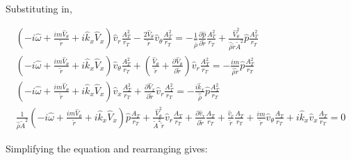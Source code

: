 \documentclass[12pt]{article}
\begin{document}
Substituting in,

\begin{small}
\begin{eqnarray}
\left(
-i \widehat{\omega} 
+ \frac{i m \widehat{V}_{\theta}}{\widetilde{r}}
+i \widehat{k}_x \widehat{V}_x 
\right) 
\widehat{v}_r 
\frac{A_T^2}{r_T}
-\frac{2 \widehat{V}_{\theta}}{\widetilde{r}} \widehat{v}_{\theta}
\frac{A_T^2}{r_T}
 = 
-\frac{1}{\widehat{\overline{\rho}}} \frac{\partial \widehat{p}}{\partial \widetilde{r}}
\frac{A_T^2}{r_T}
+\frac{\widehat{V}_{\theta}^2}{\widehat{\overline{\rho}} \widetilde{r} \widetilde{A}^2} 
\widehat{p}
\frac{A_T^2}{r_T}
\nonumber
\\
\left(
-i \widehat{\omega} 
+ \frac{i m \widehat{V}_{\theta}}{\widetilde{r}}
+i \widehat{k}_x \widehat{V}_x 
\right) 
\widehat{v}_{\theta} 
\frac{A_T^2}{r_T}
+
\left(
\frac{\widehat{V}_{\theta}}{\widetilde{r}}
+\frac{\partial \widehat{V}_{\theta}}{\partial \widetilde{r}}
\right) \widehat{v}_r
\frac{A_T^2}{r_T}
 = 
-\frac{i m}{\widehat{\overline{\rho}} \widetilde{r}} \widehat{p}
\frac{A_T^2}{r_T}
\nonumber
\\
\left(
-i \widehat{\omega}
+ \frac{i m \widehat{V}_{\theta}}{\widetilde{r}}
+i \widehat{k}_x \widehat{V}_x 
\right) 
\widehat{v}_{x} 
\frac{A_T^2}{r_T}
+\frac{\partial \widehat{V}_x}{\partial \widetilde{r}} \widehat{v}_r
\frac{A_T^2}{r_T}
 = 
-\frac{i \widehat{k}_x}{\widehat{\overline{\rho}}} \widehat{p}
\frac{A_T^2}{r_T}
\nonumber
\\
\frac{1}{ \widehat{\overline{\rho}} \widetilde{A}^2}
\left(
-i \widehat{\omega}
+ \frac{i m \widehat{V}_{\theta}}{\widetilde{r}}
+i \widehat{k}_x \widehat{V}_x 
\right) 
\widehat{p} 
\frac{A_T}{r_T}
+\frac{\widehat{V}_{\theta}^2}{\widetilde{A}^2 \widetilde{r}}
\widehat{v}_r
\frac{A_T}{r_T}
+ 
\frac{\partial \widehat{v}_r}{\partial \widetilde{r}}
\frac{A_T}{r_T}
+ 
\frac{\widehat{v}_r}{\widetilde{r}} 
\frac{A_T}{r_T}
+\frac{i m }{\widetilde{r}} \widehat{v}_{\theta} 
\frac{A_T}{r_T}
+ i \widehat{k}_x \widehat{v}_x
\frac{A_T}{r_T}
 = 
0
\nonumber
\end{eqnarray}
\end{small}%

Simplifying the equation and rearranging gives:
\end{document}
